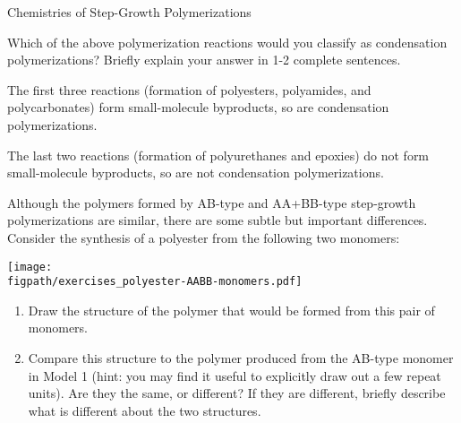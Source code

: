 \begin{activity}{Chemistries of Step-Growth Polymerizations}
\begin{ctqs}
		\vspace{0.25in}
		\question Which of the above polymerization reactions would you classify as condensation polymerizations?  Briefly explain your answer in 1-2 complete sentences.
			
				\begin{solution}[2in]
					The first three reactions (formation of polyesters, polyamides, and polycarbonates) form small-molecule byproducts, so are condensation polymerizations.
					
					The last two reactions (formation of polyurethanes and epoxies) do not form small-molecule byproducts, so are not condensation polymerizations.
				\end{solution}
			
\end{ctqs}
	

\clearpage
\begin{exercises}

		
		\exercise \label{\labelbase:exc:AABBester} Although the polymers formed by AB-type and AA+BB-type step-growth polymerizations are similar, there are some subtle but important differences.
			Consider the synthesis of a polyester from the following two monomers:
			
			\centerline{\texttt{[image: \\figpath/exercises\_polyester-AABB-monomers.pdf]}}	
			
			\begin{enumerate}
				\item Draw the structure of the polymer that would be formed from this pair of monomers.
					
					\begin{solution}\end{solution}
					
				\item Compare this structure to the polymer produced from the AB-type monomer in Model 1 (hint: you may find it useful to explicitly draw out a few repeat units).  Are they the same, or different?  If they are different, briefly describe what is different about the two structures.
					
					\begin{solution}
\end{solution}
\end{enumerate}
\end{exercises}
\end{activity}
